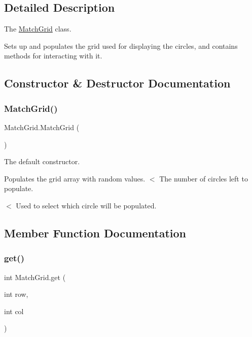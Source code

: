 \subsection{Detailed Description}
The \mbox{\hyperlink{class_match_grid}{Match\+Grid}} class. 

Sets up and populates the grid used for displaying the circles, and contains methods for interacting with it. 

\subsection{Constructor \& Destructor Documentation}
\mbox{\label{class_match_grid_acfd92ec568e826d6ea23fb7d2bb92800}} 
\subsubsection{\texorpdfstring{Match\+Grid()}{MatchGrid()}}
{\footnotesize\ttfamily Match\+Grid.\+Match\+Grid (\begin{DoxyParamCaption}{ }\end{DoxyParamCaption})}



The default constructor. 

Populates the grid array with random values. $<$ The number of circles left to populate.

$<$ Used to select which circle will be populated. 

\subsection{Member Function Documentation}
\mbox{\label{class_match_grid_a3ac68858317325bcd611aa811dab54ad}} 
\subsubsection{\texorpdfstring{get()}{get()}}
{\footnotesize\ttfamily int Match\+Grid.\+get (\begin{DoxyParamCaption}\item[{int}]{row,  }\item[{int}]{col }\end{DoxyParamCaption})}



